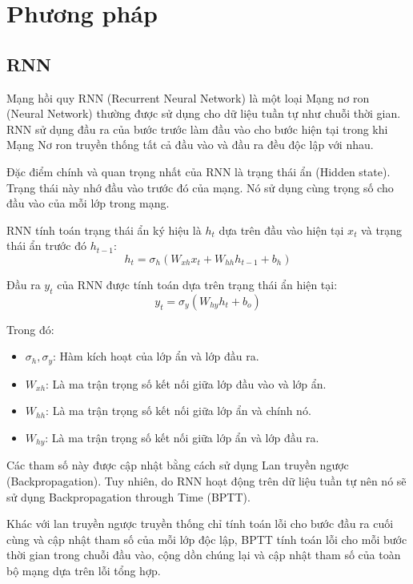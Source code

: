 \documentclass[conference]{IEEEtran}
\begin{document}
\section{Phương pháp}

\subsection{RNN}
Mạng hồi quy RNN (Recurrent Neural Network) là một loại Mạng nơ ron (Neural Network) thường được sử dụng cho dữ liệu tuần tự như chuỗi thời gian. RNN sử dụng đầu ra của bước trước làm đầu vào cho bước hiện tại trong khi Mạng Nơ ron truyền thống tất cả đầu vào và đầu ra đều độc lập với nhau.

Đặc điểm chính và quan trọng nhất của RNN là trạng thái ẩn (Hidden state). Trạng thái này nhớ đầu vào trước đó của mạng. Nó sử dụng cùng trọng số cho đầu vào của mỗi lớp trong mạng.

RNN tính toán trạng thái ẩn ký hiệu là \(h_t\) dựa trên đầu vào hiện tại \(x_t\) và trạng thái ẩn trước đó \(h_{t-1}\):
\[
h_t = \sigma_h (W_{xh} x_t + W_{hh} h_{t-1} + b_h)
\]

Đầu ra \(y_t\) của RNN được tính toán dựa trên trạng thái ẩn hiện tại:
\[
y_t = \sigma_y (W_{hy} h_t + b_o)
\]

Trong đó:
\begin{itemize}
    \item \(\sigma_h, \sigma_y\): Hàm kích hoạt của lớp ẩn và lớp đầu ra.
    \item \(W_{xh}\): Là ma trận trọng số kết nối giữa lớp đầu vào và lớp ẩn.
    \item \(W_{hh}\): Là ma trận trọng số kết nối giữa lớp ẩn và chính nó.
    \item \(W_{hy}\): Là ma trận trọng số kết nối giữa lớp ẩn và lớp đầu ra.
\end{itemize}

Các tham số này được cập nhật bằng cách sử dụng Lan truyền ngược (Backpropagation). Tuy nhiên, do RNN hoạt động trên dữ liệu tuần tự nên nó sẽ sử dụng Backpropagation through Time (BPTT).

Khác với lan truyền ngược truyền thống chỉ tính toán lỗi cho bước đầu ra cuối cùng và cập nhật tham số của mỗi lớp độc lập, BPTT tính toán lỗi cho mỗi bước thời gian trong chuỗi đầu vào, cộng dồn chúng lại và cập nhật tham số của toàn bộ mạng dựa trên lỗi tổng hợp.
\end{document}
